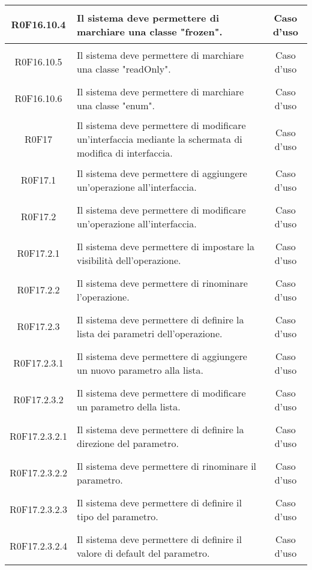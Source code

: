 \documentclass[../AnalisiDeiRequisiti.tex]{subfiles}
\begin{document}
\begin{longtable}{|c|>{\centering}p{7cm}|c|}
\hypertarget{R0F16.10.4}{R0F16.10.4} & Il sistema deve permettere di marchiare una classe "frozen". & Caso d'uso \\ \hline
\hypertarget{R0F16.10.5}{R0F16.10.5} & Il sistema deve permettere di marchiare una classe "readOnly". & Caso d'uso \\ \hline
\hypertarget{R0F16.10.6}{R0F16.10.6} & Il sistema deve permettere di marchiare una classe "enum". & Caso d'uso \\ \hline
\hypertarget{R0F17}{R0F17} & Il sistema deve permettere di modificare un'interfaccia mediante la schermata di modifica di interfaccia. & Caso d'uso \\ \hline
\hypertarget{R0F17.1}{R0F17.1} & Il sistema deve permettere di aggiungere un'operazione all'interfaccia. & Caso d'uso \\ \hline
\hypertarget{R0F17.2}{R0F17.2} & Il sistema deve permettere di modificare un'operazione all'interfaccia. & Caso d'uso \\ \hline
\hypertarget{R0F17.2.1}{R0F17.2.1} & Il sistema deve permettere di impostare la visibilità dell'operazione. & Caso d'uso \\ \hline
\hypertarget{R0F17.2.2}{R0F17.2.2} & Il sistema deve permettere di rinominare l'operazione. & Caso d'uso \\ \hline
\hypertarget{R0F17.2.3}{R0F17.2.3} & Il sistema deve permettere di definire la lista dei parametri dell'operazione. & Caso d'uso \\ \hline
\hypertarget{R0F17.2.3.1}{R0F17.2.3.1} & Il sistema deve permettere di aggiungere un nuovo parametro alla lista. & Caso d'uso \\ \hline
\hypertarget{R0F17.2.3.2}{R0F17.2.3.2} & Il sistema deve permettere di modificare un parametro della lista. & Caso d'uso \\ \hline
\hypertarget{R0F17.2.3.2.1}{R0F17.2.3.2.1} & Il sistema deve permettere di definire la direzione del parametro. & Caso d'uso \\ \hline
\hypertarget{R0F17.2.3.2.2}{R0F17.2.3.2.2} & Il sistema deve permettere di rinominare il parametro. & Caso d'uso \\ \hline
\hypertarget{R0F17.2.3.2.3}{R0F17.2.3.2.3} & Il sistema deve permettere di definire il tipo del parametro. & Caso d'uso \\ \hline
\hypertarget{R0F17.2.3.2.4}{R0F17.2.3.2.4} & Il sistema deve permettere di definire il valore di default del parametro. & Caso d'uso \\ \hline

\end{longtable}
\end{document}
